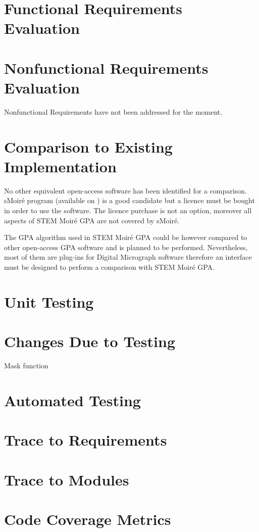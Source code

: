 \documentclass[12pt, titlepage]{article}
\newcommand{\progname}{STEM Moir{\'e} GPA}
\begin{document}
\section{Functional Requirements Evaluation}



\section{Nonfunctional Requirements Evaluation}

Nonfunctional Requirements have not been addressed for the moment.
	
\section{Comparison to Existing Implementation}	

No other equivalent open-access software has been identified for a comparison. sMoir{\'e} program (available on ) is a good candidate but a licence must be bought in order to use the software. The licence purchase is not an option, moreover all aspects of \progname{} are not covered by sMoir{\'e}.

The GPA algorithm used in \progname{} could be however compared to other open-access GPA software and is planned to be performed. Nevertheless, most of them are plug-ins for Digital Micrograph software therefore an interface must be designed to perform a comparison with \progname{}. 

\section{Unit Testing}



\section{Changes Due to Testing}

Mask function 

\section{Automated Testing}
		
\section{Trace to Requirements}
		
\section{Trace to Modules}		

\section{Code Coverage Metrics}




\end{document}
